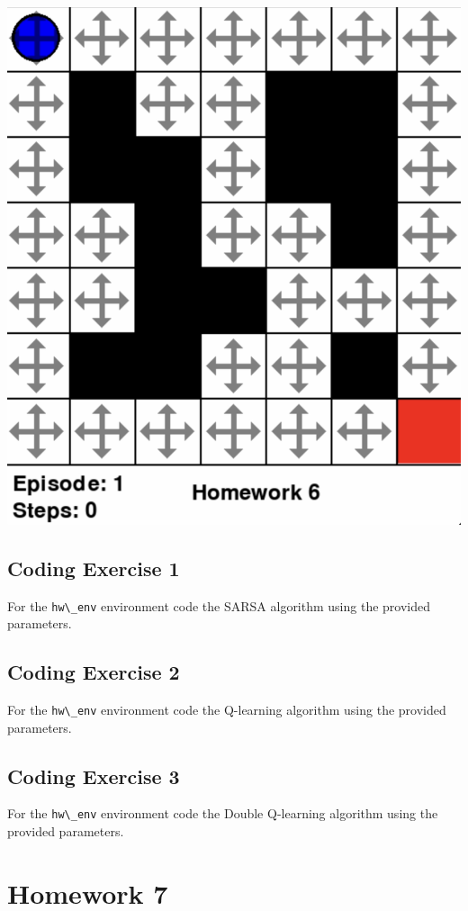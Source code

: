 \documentclass[
  letterpaper,
  DIV=11,
  numbers=noendperiod]{scrreprt}
\makeatletter
\newcommand*\pandocbounded[1]{%
  \sbox\pandoc@box{#1}%
  \Gscale@div\@tempa{\textheight}{\dimexpr\ht\pandoc@box+\dp\pandoc@box\relax}%
  \Gscale@div\@tempb{\linewidth}{\wd\pandoc@box}%
  \ifdim\@tempb\p@<\@tempa\p@\let\@tempa\@tempb\fi%
  \ifdim\@tempa\p@<\p@\scalebox{\@tempa}{\usebox\pandoc@box}%
  \else\usebox{\pandoc@box}%
  \fi%
}
\makeatother
\begin{document}
\begin{center}
\includegraphics[width=0.4\linewidth,height=\textheight,keepaspectratio]{homework/images/hw6-1.png}
\end{center}

\section{Coding Exercise 1}\label{coding-exercise-1-3}

For the \texttt{hw\textbackslash{}\_env} environment code the SARSA
algorithm using the provided parameters.

\section{Coding Exercise 2}\label{coding-exercise-2-2}

For the \texttt{hw\textbackslash{}\_env} environment code the Q-learning
algorithm using the provided parameters.

\section{Coding Exercise 3}\label{coding-exercise-3-1}

For the \texttt{hw\textbackslash{}\_env} environment code the Double
Q-learning algorithm using the provided parameters.

\section{\texorpdfstring{\href{https://colab.research.google.com/drive/1Y_A4uKoSmjc6EmU-Or7tbeo3fe_ZD4RH?usp=sharing}{\protect\pandocbounded{}}}{}}\label{section-4}

\chapter{Homework 7}\label{homework-7}
\end{document}
